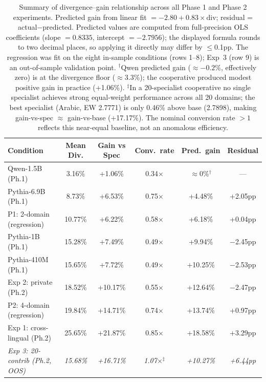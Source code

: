 \documentclass{article}
\begin{document}
\begin{table}[h]
\centering
\caption{Summary of divergence--gain relationship across all Phase 1 and Phase 2 experiments. Predicted gain from linear fit $= -2.80 + 0.83 \times \text{div}$; residual = actual$-$predicted. Predicted values are computed from full-precision OLS coefficients (slope $= 0.8335$, intercept $= -2.7956$); the displayed formula rounds to two decimal places, so applying it directly may differ by $\leq$0.1pp. The regression was fit on the eight in-sample conditions (rows 1--8); Exp~3 (row 9) is an out-of-sample validation point. $^{\dagger}$Qwen predicted gain ($\approx{-}0.2\%$, effectively zero) is at the divergence floor ($\approx$3.3\%); the cooperative produced modest positive gain in practice (+1.06\%). $^{\ddagger}$In a 20-specialist cooperative no single specialist achieves strong equal-weight performance across all 20 domains; the best specialist (Arabic, EW 2.7771) is only 0.46\% above base (2.7898), making gain-vs-spec $\approx$ gain-vs-base (+17.17\%). The nominal conversion rate $>1$ reflects this near-equal baseline, not an anomalous efficiency.}
\label{tab:divergence_gain}
\small
\begin{tabular}{lccccc}
\toprule
\textbf{Condition} & \textbf{Mean Div.} & \textbf{Gain vs Spec} & \textbf{Conv.\ rate} & \textbf{Pred.\ gain} & \textbf{Residual} \\
\midrule
Qwen-1.5B (Ph.1)            & 3.16\%  & +1.06\%  & 0.34$\times$ & $\approx$0\%$^{\dagger}$ & --- \\
Pythia-6.9B (Ph.1)          & 8.73\%  & +6.53\%  & 0.75$\times$ & +4.48\%  & +2.05pp \\
P1: 2-domain (regression)   & 10.77\% & +6.22\%  & 0.58$\times$ & +6.18\%  & +0.04pp \\
Pythia-1B (Ph.1)            & 15.28\% & +7.49\%  & 0.49$\times$ & +9.94\%  & $-$2.45pp \\
Pythia-410M (Ph.1)          & 15.65\% & +7.72\%  & 0.49$\times$ & +10.25\% & $-$2.53pp \\
Exp 2: private (Ph.2)       & 18.52\% & +10.17\% & 0.55$\times$ & +12.64\% & $-$2.47pp \\
P2: 4-domain (regression)   & 19.84\% & +14.71\% & 0.74$\times$ & +13.74\% & +0.97pp \\
Exp 1: cross-lingual (Ph.2) & 25.65\% & +21.87\% & 0.85$\times$ & +18.58\% & +3.29pp \\
\midrule
\textit{Exp 3: 20-contrib (Ph.2, OOS)} & \textit{15.68\%} & \textit{+16.71\%} & \textit{1.07$\times$$^{\ddagger}$} & \textit{+10.27\%} & \textit{+6.44pp} \\
\bottomrule
\end{tabular}
\end{table}
\end{document}
